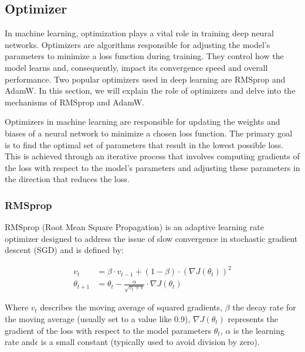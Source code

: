 \subsection{Optimizer}

In machine learning, optimization plays a vital role in training deep neural networks. Optimizers are algorithms responsible for adjusting the model's parameters to minimize a loss function during training. They control how the model learns and, consequently, impact its convergence speed and overall performance. Two popular optimizers used in deep learning are RMSprop and AdamW. In this section, we will explain the role of optimizers and delve into the mechanisms of RMSprop and AdamW.

Optimizers in machine learning are responsible for updating the weights and biases of a neural network to minimize a chosen loss function. The primary goal is to find the optimal set of parameters that result in the lowest possible loss. This is achieved through an iterative process that involves computing gradients of the loss with respect to the model's parameters and adjusting these parameters in the direction that reduces the loss.

\subsubsection{RMSprop}

RMSprop (Root Mean Square Propagation) is an adaptive learning rate optimizer designed to address the issue of slow convergence in stochastic gradient descent (SGD) and is defined by:


\begin{align}
	v_t &= \beta \cdot v_{t-1} + (1 - \beta) \cdot (\nabla J(\theta_t))^2 
	\\
	\theta_{t+1} &= \theta_t - \frac{\alpha}{\sqrt{v_t + \epsilon}} \cdot \nabla J(\theta_t)
\end{align}    

Where \(v_t\) describes the moving average of squared gradients, \(\beta\) the decay rate for the moving average (usually set to a value like 0.9), \(\nabla J(\theta_t)\) represents the gradient of the loss with respect to the model parameters \(\theta_t\), \(\alpha\) is the learning rate and\(\epsilon\) is a small constant (typically used to avoid division by zero).

